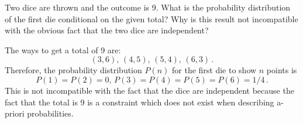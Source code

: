 

Two dice are thrown and the outcome is 9.
What is the probability distribution of the first die conditional on the given total?
Why is this result not incompatible with the obvious fact that the two dice are independent?

The ways to get a total of 9 are:
\begin{equation*}
  (3, 6), \, (4, 5), \, (5, 4), \, (6, 3)
  \, .
\end{equation*}
Therefore, the probability distribution $P(n)$ for the first die to show $n$ points is
\begin{equation*}
  P(1)=P(2)=0, \, P(3)=P(4)=P(5)=P(6)=1/4
  \, .
\end{equation*}
This is not incompatible with the fact that the dice are independent because the fact that the total is 9 is a constraint which does not exist when describing a-priori probabilities.
